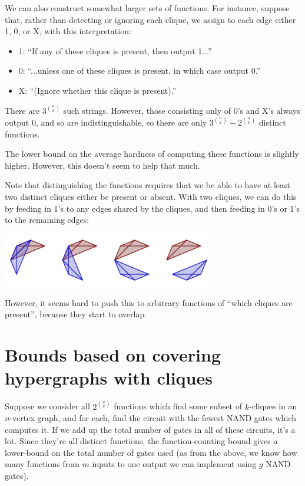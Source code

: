 \documentclass[12pt]{article}
\theoremstyle{definition}
\begin{document}
We can also construct somewhat larger sets of functions. For instance,
suppose that, rather than detecting or ignoring each clique, we assign
to each edge either 1, 0, or X, with this interpretation:

\begin{itemize}

\item 1: ``If any of these cliques is present, then output 1...''

\item 0: ``...unless one of these cliques is present, in which case output 0.''

\item X: ``(Ignore whether this clique is present).''

\end{itemize}

There are $3^{n \choose k}$ such strings. However, those consisting only of
0's and X's always output 0, and so are indistinguishable, so there are
only $3^{n \choose k} - 2^{n \choose k}$ distinct functions.

The lower bound on the average hardness of computing these functions is
slightly higher. However, this doesn't seem to help that much.

Note that distinguishing the functions requires that we be able to have at
least two distinct cliques either be present or absent. With two cliques,
we can do this by feeding in 1's to any edges shared by the cliques, and
then feeding in 0's or 1's to the remaining edges:

\includegraphics[width=0.7\textwidth]{R/overlapping.pdf}

However, it seems hard to push this to arbitrary functions of ``which cliques are
present'', because they start to overlap.

\section{Bounds based on covering hypergraphs with cliques}
\label{sec:linearInequality}

Suppose we consider all $2^{n \choose k}$ functions which find some subset
of $k$-cliques in an $n$-vertex graph, and for each, find the circuit with
the fewest NAND gates which computes it. If we add up the total number of
gates in all of these circuits,
it's a lot. Since they're all distinct functions, the
function-counting bound gives a lower-bound on
the total number of gates used (as from the
above, we know how many functions from $m$ inputs to one output
we can implement using $g$ NAND gates).
\end{document}
